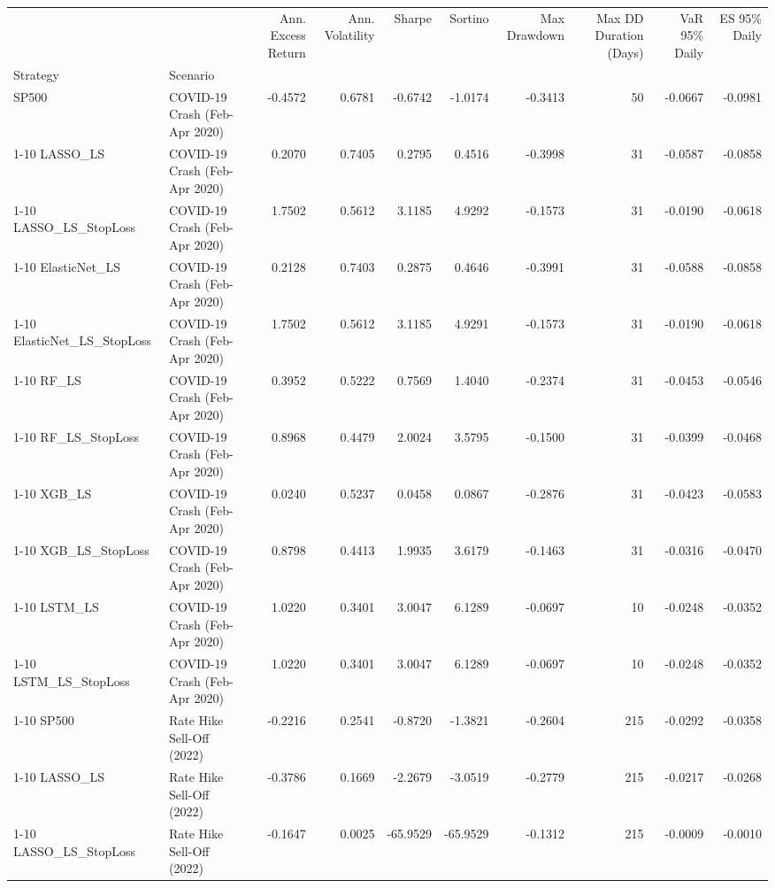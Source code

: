 \begin{tabular}{llrrrrrrrr}
\toprule
 &  & Ann. Excess Return & Ann. Volatility & Sharpe & Sortino & Max Drawdown & Max DD Duration (Days) & VaR 95\% Daily & ES 95\% Daily \\
Strategy & Scenario &  &  &  &  &  &  &  &  \\
\midrule
SP500 & COVID-19 Crash (Feb-Apr 2020) & -0.4572 & 0.6781 & -0.6742 & -1.0174 & -0.3413 & 50 & -0.0667 & -0.0981 \\
\cline{1-10}
LASSO\_LS & COVID-19 Crash (Feb-Apr 2020) & 0.2070 & 0.7405 & 0.2795 & 0.4516 & -0.3998 & 31 & -0.0587 & -0.0858 \\
\cline{1-10}
LASSO\_LS\_StopLoss & COVID-19 Crash (Feb-Apr 2020) & 1.7502 & 0.5612 & 3.1185 & 4.9292 & -0.1573 & 31 & -0.0190 & -0.0618 \\
\cline{1-10}
ElasticNet\_LS & COVID-19 Crash (Feb-Apr 2020) & 0.2128 & 0.7403 & 0.2875 & 0.4646 & -0.3991 & 31 & -0.0588 & -0.0858 \\
\cline{1-10}
ElasticNet\_LS\_StopLoss & COVID-19 Crash (Feb-Apr 2020) & 1.7502 & 0.5612 & 3.1185 & 4.9291 & -0.1573 & 31 & -0.0190 & -0.0618 \\
\cline{1-10}
RF\_LS & COVID-19 Crash (Feb-Apr 2020) & 0.3952 & 0.5222 & 0.7569 & 1.4040 & -0.2374 & 31 & -0.0453 & -0.0546 \\
\cline{1-10}
RF\_LS\_StopLoss & COVID-19 Crash (Feb-Apr 2020) & 0.8968 & 0.4479 & 2.0024 & 3.5795 & -0.1500 & 31 & -0.0399 & -0.0468 \\
\cline{1-10}
XGB\_LS & COVID-19 Crash (Feb-Apr 2020) & 0.0240 & 0.5237 & 0.0458 & 0.0867 & -0.2876 & 31 & -0.0423 & -0.0583 \\
\cline{1-10}
XGB\_LS\_StopLoss & COVID-19 Crash (Feb-Apr 2020) & 0.8798 & 0.4413 & 1.9935 & 3.6179 & -0.1463 & 31 & -0.0316 & -0.0470 \\
\cline{1-10}
LSTM\_LS & COVID-19 Crash (Feb-Apr 2020) & 1.0220 & 0.3401 & 3.0047 & 6.1289 & -0.0697 & 10 & -0.0248 & -0.0352 \\
\cline{1-10}
LSTM\_LS\_StopLoss & COVID-19 Crash (Feb-Apr 2020) & 1.0220 & 0.3401 & 3.0047 & 6.1289 & -0.0697 & 10 & -0.0248 & -0.0352 \\
\cline{1-10}
SP500 & Rate Hike Sell-Off (2022) & -0.2216 & 0.2541 & -0.8720 & -1.3821 & -0.2604 & 215 & -0.0292 & -0.0358 \\
\cline{1-10}
LASSO\_LS & Rate Hike Sell-Off (2022) & -0.3786 & 0.1669 & -2.2679 & -3.0519 & -0.2779 & 215 & -0.0217 & -0.0268 \\
\cline{1-10}
LASSO\_LS\_StopLoss & Rate Hike Sell-Off (2022) & -0.1647 & 0.0025 & -65.9529 & -65.9529 & -0.1312 & 215 & -0.0009 & -0.0010 \\

\end{tabular}
